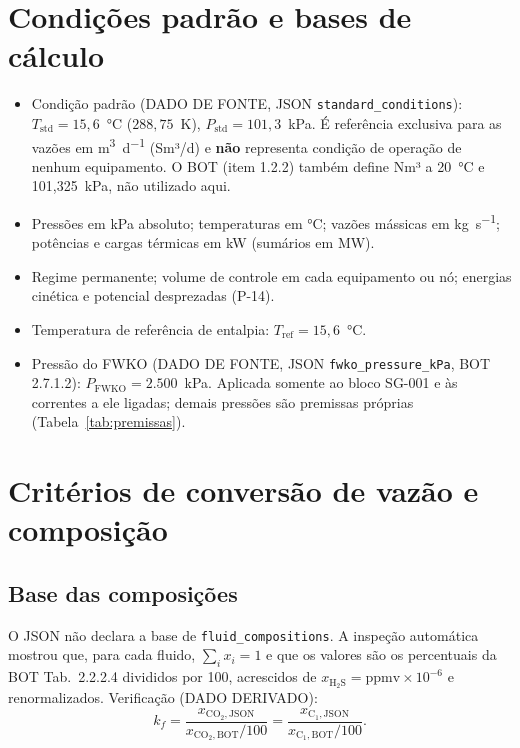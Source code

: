 \documentclass[11pt,a4paper]{article}
\numberwithin{equation}{section}
\numberwithin{table}{section}
\numberwithin{figure}{section}
\newcommand{\tipo}[1]{\textsf{\footnotesize #1}}
\begin{document}
\section{Condições padrão e bases de cálculo}
\begin{itemize}
\item Condição padrão (\tipo{DADO DE FONTE}, JSON \texttt{standard\_conditions}): $T_{\mathrm{std}}=15{,}6$~\si{\celsius} ($288{,}75$~\si{\kelvin}), $P_{\mathrm{std}}=101{,}3$~\si{\kilo\pascal}. É referência exclusiva para as vazões em \si{\cubic\metre\per\day} (Sm³/d) e \textbf{não} representa condição de operação de nenhum equipamento. O BOT (item 1.2.2) também define Nm³ a 20~\si{\celsius} e 101,325~\si{\kilo\pascal}, não utilizado aqui.
\item Pressões em kPa absoluto; temperaturas em \si{\celsius}; vazões mássicas em \si{\kilogram\per\second}; potências e cargas térmicas em \si{\kilo\watt} (sumários em \si{\mega\watt}).
\item Regime permanente; volume de controle em cada equipamento ou nó; energias cinética e potencial desprezadas (P-14).
\item Temperatura de referência de entalpia: $T_{\mathrm{ref}}=15{,}6$~\si{\celsius}.
\item Pressão do FWKO (\tipo{DADO DE FONTE}, JSON \texttt{fwko\_pressure\_kPa}, BOT 2.7.1.2): $P_{\mathrm{FWKO}}=2.500$~\si{\kilo\pascal}. Aplicada somente ao bloco SG-001 e às correntes a ele ligadas; demais pressões são premissas próprias (Tabela~\ref{tab:premissas}).
\end{itemize}

\section{Critérios de conversão de vazão e composição}\label{sec:conversao}
\subsection{Base das composições}
O JSON não declara a base de \texttt{fluid\_compositions}. A inspeção automática mostrou que, para cada fluido, $\sum_i x_i = 1$ e que os valores são os percentuais da BOT Tab.~2.2.2.4 divididos por 100, acrescidos de $x_{\mathrm{H_2S}} = \mathrm{ppmv}\times10^{-6}$ e renormalizados. Verificação (\tipo{DADO DERIVADO}):
\begin{equation}
k_f = \frac{x_{\mathrm{CO_2},\mathrm{JSON}}}{x_{\mathrm{CO_2},\mathrm{BOT}}/100} = \frac{x_{\mathrm{C_1},\mathrm{JSON}}}{x_{\mathrm{C_1},\mathrm{BOT}}/100}.
\end{equation}
\end{document}
